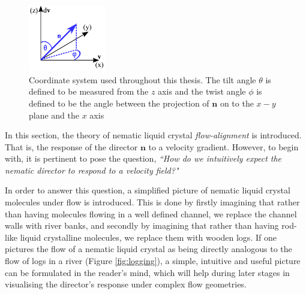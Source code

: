 \begin{figure}
\begin{center}
\includegraphics[width=0.3\textwidth]{Figures/Theory/coords}
\end{center}
\caption[Coordinate system]{\label{fig:coords}Coordinate system used throughout this thesis. The tilt angle $\theta$ is defined to be measured from the $z$ axis and the twist angle $\phi$ is defined to be the angle between the projection of $\mathbf{n}$ on to the $x-y$ plane and the $x$ axis}
\end{figure}

In this section, the theory of nematic liquid crystal \textit{flow-alignment} is introduced. That is, the response of the director $\mathbf{n}$ to a velocity gradient. However, to begin with, it is pertinent to pose the question, \textit{``How do we intuitively expect the nematic director to respond to a velocity field?"}

In order to answer this question, a simplified picture of nematic liquid crystal molecules under flow is introduced. This is done by firstly imagining that rather than having molecules flowing in a well defined channel, we replace the channel walls with river banks, and secondly by imagining that rather than having rod-like liquid crystalline molecules, we replace them with wooden logs. If one pictures the flow of a nematic liquid crystal as being directly analogous to the flow of logs in a river (Figure \ref{fig:logging}), a simple, intuitive and useful picture can be formulated in the reader's mind, which will help during later stages in visualising the director's response under complex flow geometries.

